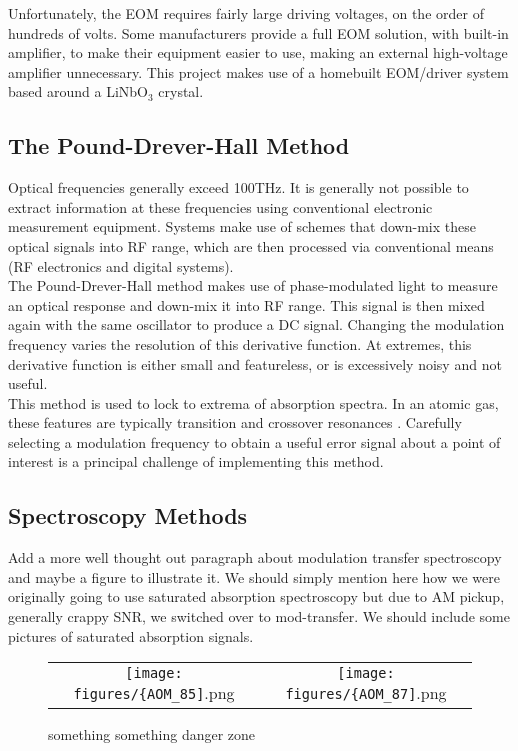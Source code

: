 Unfortunately, the EOM requires fairly large driving voltages, on the order of hundreds of volts.  Some manufacturers provide a full EOM solution, with built-in amplifier, to make their equipment easier to use, making an external high-voltage amplifier unnecessary. This project makes use of a homebuilt EOM/driver system based around a LiNbO$_3$ crystal.

\subsection{The Pound-Drever-Hall Method}

Optical frequencies generally exceed 100THz. It is generally not possible to
extract information at these frequencies using conventional
electronic measurement equipment.  Systems make use of
schemes that down-mix these optical signals into RF range, which are then
processed via conventional means (RF electronics and digital systems). \\

The Pound-Drever-Hall method makes use of phase-modulated light to measure an
optical response and down-mix it into RF range.  This signal is then mixed again with the same oscillator to produce a DC signal. Changing the modulation frequency varies the resolution of this derivative function.  At extremes, this derivative function is either small and featureless, or is excessively noisy and not useful. \\

This method is used to lock to extrema of absorption spectra.  In an atomic gas, these features are typically transition and crossover resonances \cite{maguire2006}. Carefully selecting a modulation frequency to obtain a useful error signal about a point of interest is a principal challenge of implementing this method.

\subsection{Spectroscopy Methods}

Add a more well thought out paragraph about modulation transfer spectroscopy and maybe a figure to illustrate it. We should simply mention here how we were originally going to use saturated absorption spectroscopy but due to AM pickup, generally crappy SNR, we switched over to mod-transfer. We should include some pictures of saturated absorption signals.


\begin{figure}
  \begin{tabular}{cc}
    \texttt{[image: figures/\{AOM\_85]}.png} &
    \texttt{[image: figures/\{AOM\_87]}.png} \\
  \end{tabular}
  \caption{something something danger zone}
\end{figure}
